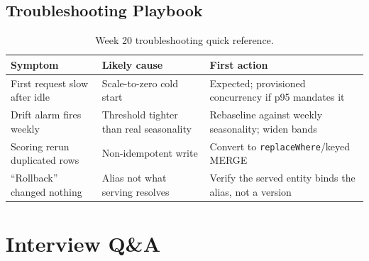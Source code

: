 \subsection{Troubleshooting Playbook}
\begin{table}[H]
\centering
\small
\begin{tabular}{@{}p{3.6cm}p{4.2cm}p{4.8cm}@{}}
\toprule
\textbf{Symptom} & \textbf{Likely cause} & \textbf{First action} \\
\midrule
First request slow after idle & Scale-to-zero cold start & Expected; provisioned concurrency if p95 mandates it \\
Drift alarm fires weekly & Threshold tighter than real seasonality & Rebaseline against weekly seasonality; widen bands \\
Scoring rerun duplicated rows & Non-idempotent write & Convert to \texttt{replaceWhere}/keyed MERGE \\
``Rollback'' changed nothing & Alias not what serving resolves & Verify the served entity binds the alias, not a version \\
\bottomrule
\end{tabular}
\caption{Week 20 troubleshooting quick reference.}
\label{tab:ch20-trouble}
\end{table}

\section{Interview Q\&A}
